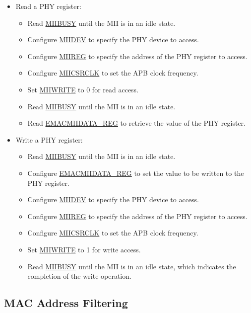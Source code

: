 \documentclass[main\_\_EN.tex]{subfiles}
\begin{document}
\begin{itemize}
\item Read a PHY register:
\begin{itemize}
    \item Read \hyperref[regdesc:EMACMIIADDRREG]{MIIBUSY} until the MII is in an idle state.
    \item Configure \hyperref[regdesc:EMACMIIADDRREG]{MIIDEV} to specify the PHY device to access.
    \item Configure \hyperref[regdesc:EMACMIIADDRREG]{MIIREG} to specify the address of the PHY register to access.
    \item Configure \hyperref[regdesc:EMACMIIADDRREG]{MIICSRCLK} to set the APB clock frequency.
    \item Set \hyperref[regdesc:EMACMIIADDRREG]{MIIWRITE} to 0 for read access.
    \item Read \hyperref[regdesc:EMACMIIADDRREG]{MIIBUSY} until the MII is in an idle state.
    \item Read \hyperref[regdesc:EMACMIIDATAREG]{EMACMIIDATA\_REG} to retrieve the value of the PHY register.
\end{itemize}
\item Write a PHY register:
\begin{itemize}
    \item Read \hyperref[regdesc:EMACMIIADDRREG]{MIIBUSY} until the MII is in an idle state.
    \item Configure \hyperref[regdesc:EMACMIIDATAREG]{EMACMIIDATA\_REG} to set the value to be written to the PHY register.
    \item Configure \hyperref[regdesc:EMACMIIADDRREG]{MIIDEV} to specify the PHY device to access.
    \item Configure \hyperref[regdesc:EMACMIIADDRREG]{MIIREG} to specify the address of the PHY register to access.
    \item Configure \hyperref[regdesc:EMACMIIADDRREG]{MIICSRCLK} to set the APB clock frequency.
    \item Set \hyperref[regdesc:EMACMIIADDRREG]{MIIWRITE} to 1 for write access.
    \item Read \hyperref[regdesc:EMACMIIADDRREG]{MIIBUSY} until the MII is in an idle state, which indicates the completion of the write operation.
\end{itemize}
\end{itemize}

\subsection{MAC Address Filtering}
\end{document}
